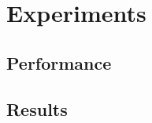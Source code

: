 \chapter{Experiments}\label{chap:Experiments}

\section{Performance}\label{sec:Performance}

\section{Results}\label{sec:Results}
